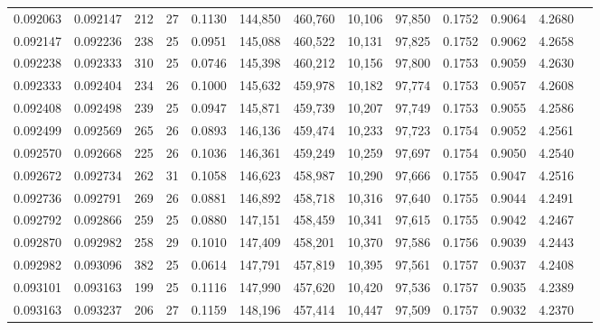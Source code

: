 \begin{tabular}{rrrrrrrrrrrrr}
0.092063 & 0.092147 & 212 &  27 &                                     0.1130 & 144,850 & 460,760 &  10,106 &  97,850 & 0.1752 & 0.9064 & 4.2680 \\
0.092147 & 0.092236 & 238 &  25 &                                     0.0951 & 145,088 & 460,522 &  10,131 &  97,825 & 0.1752 & 0.9062 & 4.2658 \\
0.092238 & 0.092333 & 310 &  25 &                                     0.0746 & 145,398 & 460,212 &  10,156 &  97,800 & 0.1753 & 0.9059 & 4.2630 \\
0.092333 & 0.092404 & 234 &  26 &                                     0.1000 & 145,632 & 459,978 &  10,182 &  97,774 & 0.1753 & 0.9057 & 4.2608 \\
0.092408 & 0.092498 & 239 &  25 &                                     0.0947 & 145,871 & 459,739 &  10,207 &  97,749 & 0.1753 & 0.9055 & 4.2586 \\
0.092499 & 0.092569 & 265 &  26 &                                     0.0893 & 146,136 & 459,474 &  10,233 &  97,723 & 0.1754 & 0.9052 & 4.2561 \\
0.092570 & 0.092668 & 225 &  26 &                                     0.1036 & 146,361 & 459,249 &  10,259 &  97,697 & 0.1754 & 0.9050 & 4.2540 \\
0.092672 & 0.092734 & 262 &  31 &                                     0.1058 & 146,623 & 458,987 &  10,290 &  97,666 & 0.1755 & 0.9047 & 4.2516 \\
0.092736 & 0.092791 & 269 &  26 &                                     0.0881 & 146,892 & 458,718 &  10,316 &  97,640 & 0.1755 & 0.9044 & 4.2491 \\
0.092792 & 0.092866 & 259 &  25 &                                     0.0880 & 147,151 & 458,459 &  10,341 &  97,615 & 0.1755 & 0.9042 & 4.2467 \\
0.092870 & 0.092982 & 258 &  29 &                                     0.1010 & 147,409 & 458,201 &  10,370 &  97,586 & 0.1756 & 0.9039 & 4.2443 \\
0.092982 & 0.093096 & 382 &  25 &                                     0.0614 & 147,791 & 457,819 &  10,395 &  97,561 & 0.1757 & 0.9037 & 4.2408 \\
0.093101 & 0.093163 & 199 &  25 &                                     0.1116 & 147,990 & 457,620 &  10,420 &  97,536 & 0.1757 & 0.9035 & 4.2389 \\
0.093163 & 0.093237 & 206 &  27 &                                     0.1159 & 148,196 & 457,414 &  10,447 &  97,509 & 0.1757 & 0.9032 & 4.2370 \\

\end{tabular}
